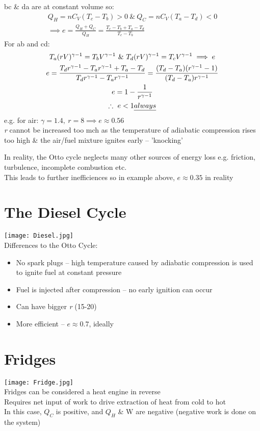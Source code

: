 \documentclass[a4paper, 11pt, fleqn, normalem]{report}
\begin{document}
bc \& da are at constant volume so:
\begin{gather*}
	Q_{H} = nC_{V}(T_{c} - T_{b}) > 0 ~\&~ Q_{C} = nC_{V}(T_{a} - T_{d}) < 0 \\
	\implies e = \frac{Q_{H} + Q_{C}}{Q_{H}} = \frac{T_{c} - T_{b} + T_{a} - T_{d}}{T_{c} - T_{b}}
\end{gather*}
For ab and cd:
\begin{gather*}
	T_{a}(rV)^{\gamma - 1} = T_{b}V^{\gamma - 1} ~\&~ T_{d}(rV)^{\gamma - 1} = T_{c}V^{\gamma - 1} \implies e \\
	e = \frac{T_{d}r^{\gamma - 1} - T_{a}r^{\gamma - 1} + T_{a} - T_{d}}{T_{d}r^{\gamma - 1} - T_{a}r^{\gamma - 1}} = \frac{(T_{d} - T_{a})(r^{\gamma - 1} - 1)}{(T_{d} - T_{a})r^{\gamma - 1}} \\
	e = 1 - \frac{1}{r^{\gamma - 1}} \\
	\therefore ~ e < 1 \emph{always}
\end{gather*}
e.g. for air: $\gamma = 1.4, ~ r = 8 \implies e \approx 0.56$ \\
\emph{r} cannot be increased too mch as the temperature of adiabatic compression rises too high \& the air/fuel mixture ignites early -- 'knocking'

In reality, the Otto cycle neglects many other sources of energy loss e.g. friction, turbulence, incomplete combustion etc. \\
This leads to further inefficiences so in example above, $e \approx 0.35$ in reality

 \section*{The Diesel Cycle}
\texttt{[image: Diesel.jpg]}\\
Differences to the Otto Cycle:
\vspace{-8pt}
\begin{itemize}
	\item No spark plugs -- high temperature caused by adiabatic compression is used to ignite fuel at constant pressure
	\item Fuel is injected after compression -- no early ignition can occur
	\item Can have bigger \emph{r} (15-20)
	\item More efficient -- $e \approx 0.7$, ideally
\end{itemize}

\section*{Fridges}
\texttt{[image: Fridge.jpg]} \\
Fridges can be considered a heat engine in reverse \\
Requires net input of work to drive extraction of heat from cold to hot \\
In this case, $Q_{C}$ is positive, and $Q_{H}$ \& W are negative (negative work is done on the system)
\end{document}
